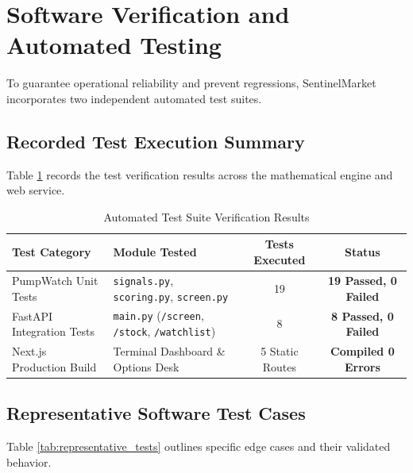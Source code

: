 \section{Software Verification and Automated Testing}
To guarantee operational reliability and prevent regressions, SentinelMarket incorporates two independent automated test suites.

\subsection{Recorded Test Execution Summary}
Table \ref{tab:test_summary} records the test verification results across the mathematical engine and web service.

\begin{table}[H]
\centering
\caption{Automated Test Suite Verification Results}
\label{tab:test_summary}
\begin{tabular}{llcc}
\toprule
\textbf{Test Category} & \textbf{Module Tested} & \textbf{Tests Executed} & \textbf{Status} \\
\midrule
PumpWatch Unit Tests & \texttt{signals.py}, \texttt{scoring.py}, \texttt{screen.py} & 19 & \textbf{19 Passed, 0 Failed} \\
FastAPI Integration Tests & \texttt{main.py} (\texttt{/screen}, \texttt{/stock}, \texttt{/watchlist}) & 8 & \textbf{8 Passed, 0 Failed} \\
Next.js Production Build & Terminal Dashboard \& Options Desk & 5 Static Routes & \textbf{Compiled 0 Errors} \\
\bottomrule
\end{tabular}
\end{table}

\subsection{Representative Software Test Cases}
Table \ref{tab:representative_tests} outlines specific edge cases and their validated behavior.

